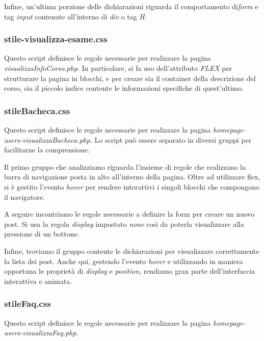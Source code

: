 \documentclass [a4paper,11pt]{book}
\begin{document}
Infine, un'ultima porzione delle dichiarazioni riguarda il comportamento di\emph{form} e tag \emph{input} contenute all'interno di \emph{div} o tag \emph{H}.

\medskip

\subsubsection{stile-visualizza-esame.css}

Questo script definisce le regole necessarie per realizzare la pagina
\emph{visualizzaInfoCorso.php}. In particolare, si fa uso dell'attributo \emph{FLEX} per strutturare la pagina in blocchi, e per creare sia il container della descrizione del corso, sia il piccolo indice contente le informazioni specifiche di quest'ultimo.

\medskip

\subsubsection{stileBacheca.css}

Questo script definisce le regole necessarie per realizzare la pagina
\emph{homepage-users-visualizzaBacheca.php}. Lo script può essere separato in diversi gruppi per facilitarne la comprensione.

Il primo gruppo che analizziamo riguarda l'insieme di regole che realizzano la barra di navigazione posta in alto all'interno della pagina. Oltre ad utilizzare flex, si è gestito l'evento \emph{hover} per rendere interattivi i singoli blocchi che compongono il navigatore.

A seguire incontriamo le regole necessarie a definire la form per creare un nuovo post. Si usa la regola \emph{display} impostato \emph{none} così da poterla visualizzare alla pressione di un bottone.

Infine, troviamo il gruppo contente le dichiarazioni per visualizzare correttamente la lista dei post. Anche qui, gestendo l'evento \emph{hover} e utilizzando in maniera opportuna le proprietà di \emph{display} e \emph{position}, rendiamo gran parte dell'interfaccia interattiva e animata.
\medskip

\subsubsection{stileFaq.css}

Questo script definisce le regole necessarie per realizzare la pagina
\emph{homepage-users-visualizzaFaq.php}. 
\end{document}
